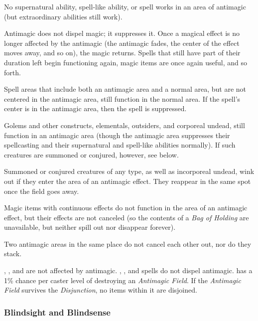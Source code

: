 \begin{itemize*}
\item No supernatural ability, spell-like ability, or spell works in an area of antimagic (but extraordinary abilities still work).
\item Antimagic does not dispel magic; it suppresses it. Once a magical effect is no longer affected by the antimagic (the antimagic fades, the center of the effect moves away, and so on), the magic returns. Spells that still have part of their duration left begin functioning again, magic items are once again useful, and so forth.
\item Spell areas that include both an antimagic area and a normal area, but are not centered in the antimagic area, still function in the normal area. If the spell's center is in the antimagic area, then the spell is suppressed.
\item Golems and other constructs, elementals, outsiders, and corporeal undead, still function in an antimagic area (though the antimagic area suppresses their spellcasting and their supernatural and spell-like abilities normally). If such creatures are summoned or conjured, however, see below. 
\item Summoned or conjured creatures of any type, as well as incorporeal undead, wink out if they enter the area of an antimagic effect. They reappear in the same spot once the field goes away.
\item Magic items with continuous effects do not function in the area of an antimagic effect, but their effects are not canceled (so the contents of a \textit{Bag of Holding} are unavailable, but neither spill out nor disappear forever).
\item Two antimagic areas in the same place do not cancel each other out, nor do they stack.
\item {}, , and  are not affected by antimagic. , , and  spells do not dispel antimagic.  has a 1\% chance per caster level of destroying an \textit{Antimagic Field}. If the \textit{Antimagic Field} survives the \textit{Disjunction}, no items within it are disjoined.
\end{itemize*}

\subsubsection{Blindsight and Blindsense}

